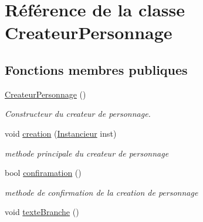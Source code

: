\hypertarget{classCreateurPersonnage}{\section{Référence de la classe Createur\-Personnage}
\label{classCreateurPersonnage}
}
\subsection*{Fonctions membres publiques}
\begin{DoxyCompactItemize}
\item 
\hypertarget{classCreateurPersonnage_a4ac249d198ea3951c43bef1d3cb392fe}{\hyperlink{classCreateurPersonnage_a4ac249d198ea3951c43bef1d3cb392fe}{Createur\-Personnage} ()}\label{classCreateurPersonnage_a4ac249d198ea3951c43bef1d3cb392fe}

\begin{DoxyCompactList}\small\item\em Constructeur du createur de personnage. \end{DoxyCompactList}\item 
void \hyperlink{classCreateurPersonnage_a37962a1a0e51e54118339119538bf18f}{creation} (\hyperlink{classInstancieur}{Instancieur} inst)
\begin{DoxyCompactList}\small\item\em methode principale du createur de personnage \end{DoxyCompactList}\item 
\hypertarget{classCreateurPersonnage_a7e35c08e904aea2dcaef8c426d0a6559}{bool \hyperlink{classCreateurPersonnage_a7e35c08e904aea2dcaef8c426d0a6559}{confiramation} ()}\label{classCreateurPersonnage_a7e35c08e904aea2dcaef8c426d0a6559}

\begin{DoxyCompactList}\small\item\em methode de confirmation de la creation de personnage \end{DoxyCompactList}\item 
\hypertarget{classCreateurPersonnage_ad19dfee81e9e5a7f9934973bed930d60}{void \hyperlink{classCreateurPersonnage_ad19dfee81e9e5a7f9934973bed930d60}{texte\-Branche} ()}\label{classCreateurPersonnage_ad19dfee81e9e5a7f9934973bed930d60}


\end{DoxyCompactItemize}
